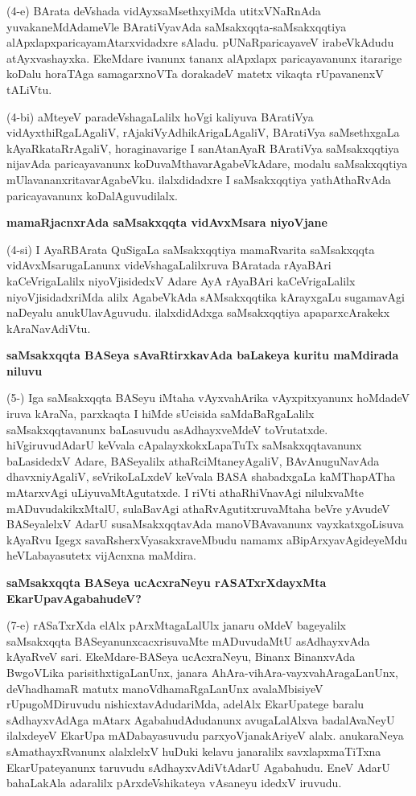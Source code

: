 \noindent
(4-e) BArata deVshada vidAyxsaMsethxyiMda utitxVNaRnAda yuvakaneMdAdameVle BAratiVyavAda saM\-sakxqqta-saMsakxqqtiya alApxlapxparicayamAtarxvidadxre sAladu. pUNaRparicayaveV irabeVkAdudu \-atAyx\-vashayxka. EkeMdare ivanunx tananx alApxlapx paricayavanunx itararige koDalu horaTAga samagarxnoVTa dora\-kadeV matetx vikaqta rUpavanenxV tALiVtu.

\smallskip
\noindent
(4-bi) aMteyeV paradeVshagaLalilx hoVgi kaliyuva BAratiVya vidAyxthiRgaLA\-galiV, rAjakiVyAdhi\-kArigaLAgaliV, BAratiVya saMsethxgaLa kAyaRkataRrAgaliV, horaginavarige I sanAtanAyaR BAra\-tiVya saMsakxqqtiya nijavAda paricaya\-vanunx koDuvaMthavarAgabeVkAdare, modalu saMsakxqqtiya mUla\-vananxrita\-varAga\-beVku. ilalxdidadxre I saMsakxqqtiya yathAthaRvAda paricayavanunx koDalAgu\-vudilalx.

{\bigskip
\noindent
{\large\bf mamaRjacnxrAda saMsakxqqta vidAvxMsara niyoVjane}}\label{page32}
\medskip

\noindent
(4-si) I AyaRBArata QuSigaLa saMsakxqqtiya mamaRvarita saMsakxqqta vidAvxMsaru\-gaLanunx videVsha\-gaLalilxruva BAratada rAyaBAri kaCeVrigaLalilx niyoVjisidedxV Adare AyA rAyaBAri kaCeVri\-gaLalilx niyoVjisidadx\-riMda alilx AgabeVkAda sAMsakxqqtika kArayxgaLu sugamavAgi naDeyalu anukUlavAgu\-vudu. ilalxdidAdxga saMsakxqqtiya apaparxcArakekx kAraNavAdiVtu.

{\bigskip
\noindent
{\large\bf saMsakxqqta BASeya sAvaRtirxkavAda baLakeya kuritu maMdirada niluvu}}\label{page33g}
\medskip

\noindent
(5-) Iga saMsakxqqta BASeyu iMtaha vAyxvahArika vAyxpitxyanunx hoMdadeV iruva kAraNa, parxkaqta I hiMde sUcisida saMdaBaRgaLalilx saMsakxqqtavanunx baLasuvudu asAdhayx\-veMdeV toVrutatxde. hiVgiruvu\-dAdarU keVvala cApalayxkokxLapaTuTx saMsakxqqta\-vanunx baLasidedxV Adare, BASeyalilx athaRciMtane\-yAgaliV, BAvAnuguNavAda dhavxni\break\-yAgaliV, seVrikoLaLxdeV keVvala BASA shabadxgaLa kaMThapATha mAtarxvAgi uLiyu\-vaMtAgutatxde. I riVti athaRhiVnavAgi nilulxvaMte mADuvudakikxMtalU, sulaBa\-vAgi athaR\-vAgu\-titxru\-vaMtaha beVre yAvudeV BASeyalelxV AdarU susaMsakxqqta\-vAda manoVBAvavanunx vayxkatx\-goLisuva kA\-yaRvu Igegx savaRsherxVyasakxraveMbudu namamx aBipArxyavAgideyeMdu heVLabayasutetx vijAcnxna maMdira.

{\bigskip
\noindent
{\large\bf saMsakxqqta BASeya ucAcxraNeyu rASATxrXdayxMta EkarUpavAgabahudeV?}}\label{page33a}
\medskip

\noindent
(7-e) rASaTxrXda elAlx pArxMtagaLalUlx janaru oMdeV bageyalilx saMsakxqqta BASeyanunx\-cacxrisu\-vaMte mADuvu\-daMtU asAdhayxvAda kAyaRveV sari. EkeMdare-BASeya ucAcxraNeyu, Binanx Binanx\-vAda BwgoV\-Lika parisithxtigaLanUnx, janara AhAra-\-vihAra\--vayxvahAragaLanUnx, deVhadhamaR matutx manoVdha\-maRgaLanUnx avalaMbisiyeV rUpugoMDiruvudu nishicxtavAdudariMda, adelAlx EkarUpatege baralu sAdhayx\-vAdAga mAtarx AgabahudAdudanunx avugaLalAlxva badalAvaNeyU ilalxdeyeV EkarUpa mADa\-bayasuvudu parxyoVjanakAriyeV alalx. anukaraNeya sAmathayxRvanunx alalxlelxV huDuki kelavu jana\-ralilx savxlapxmaTiTxna EkarUpateyanunx taruvudu sAdhayxvAdiVtAdarU Agabahudu. EneV AdarU bahaLa\-kAla adaralilx pArxdeV\-shikateya vAsaneyu idedxV iruvudu.


